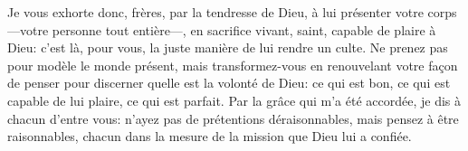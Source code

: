Je vous exhorte donc, frères, par la tendresse de Dieu,
	à lui présenter votre corps ---votre personne tout entière---,
	en sacrifice vivant, saint, capable de plaire à Dieu:
	c’est là, pour vous, la juste manière de lui rendre un culte.
Ne prenez pas pour modèle le monde présent,
	mais transformez-vous en renouvelant votre façon de penser
	pour discerner quelle est la volonté de Dieu:
	ce qui est bon, ce qui est capable de lui plaire, ce qui est parfait.
Par la grâce qui m’a été accordée, je dis à chacun d’entre vous:
	n’ayez pas de prétentions déraisonnables, mais pensez à être raisonnables,
	chacun dans la mesure de la mission que Dieu lui a confiée.

